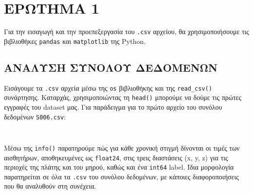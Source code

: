 \chapter{ΕΡΩΤΗΜΑ 1}
    Για την εισαγωγή και την προεπεξεργασία του \texttt{.csv} αρχείου, θα χρησιμοποιήσουμε τις βιβλιοθήκες \texttt{pandas} και \texttt{matplotlib} της Python.

    \section{ΑΝΑΛΥΣΗ ΣΥΝΟΛΟΥ ΔΕΔΟΜΕΝΩΝ}
        Εισάγουμε τα \texttt{.csv} αρχεία μέσω της \texttt{os} βιβλιοθήκης και της \texttt{read\_csv()} συνάρτησης.
        Καταρχάς, χρησιμοποιώντας τη \texttt{head()} μπορούμε να δούμε τις πρώτες εγγραφές του dataset μας.
        Για παράδειγμα για το πρώτο αρχείο του συνόλου δεδομένων \texttt{S006.csv}:

        \begin{table}[ht] \noindent\centering\tt
        \end{table}

        Μέσω της \texttt{info()} παρατηρούμε πώς για κάθε χρονική στιγμή δίνονται οι τιμές των αισθητήρων, αποθηκευμένες ως \texttt{float24},
        στις τρεις διαστάσεις (x, y, z) για τις περιοχές της πλάτης και του μηρού, καθώς και ένα \texttt{int64} label.
        Ίδια μορφολογία παρατηρείται σε όλα τα \texttt{.csv} του συνόλου δεδομένων, με κάποιες διαφοροποιήσεις που θα αναλυθούν στη συνέχεια.

